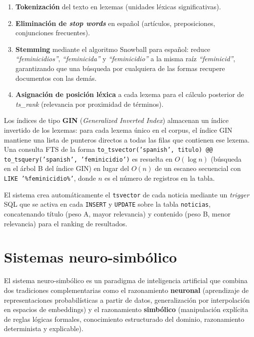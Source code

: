 \begin{enumerate}
    \item \textbf{Tokenización} del texto en lexemas (unidades léxicas significativas).
    \item \textbf{Eliminación de \textit{stop words}} en español (artículos,
          preposiciones, conjunciones frecuentes).
    \item \textbf{Stemming} mediante el algoritmo Snowball para español: reduce
          \textit{``feminicidios''}, \textit{``feminicida''} y
          \textit{``feminicidio''} a la misma raíz \textit{``feminicid''},
          garantizando que una búsqueda por cualquiera de las formas recupere
          documentos con las demás.
    \item \textbf{Asignación de posición léxica} a cada lexema para el cálculo
          posterior de \textit{ts\_rank} (relevancia por proximidad de términos).
\end{enumerate}

Los índices de tipo \textbf{GIN} (\textit{Generalized Inverted Index})
\cite{ramakrishnan2000database} almacenan un índice invertido de los lexemas:
para cada lexema único en el corpus, el índice GIN mantiene una lista de punteros
directos a todas las filas que contienen ese lexema. Una consulta FTS de la forma
\texttt{to\_tsvector('spanish', titulo) @@ to\_tsquery('spanish', 'feminicidio')}
es resuelta en $O(\log n)$ (búsqueda en el árbol B del índice GIN) en lugar del
$O(n)$ de un escaneo secuencial con \texttt{LIKE '\%feminicidio\%'}, donde $n$
es el número de registros en la tabla.

El sistema crea automáticamente el \texttt{tsvector} de cada noticia mediante un
\textit{trigger} SQL que se activa en cada \texttt{INSERT} y \texttt{UPDATE}
sobre la tabla \texttt{noticias}, concatenando título (peso A, mayor relevancia)
y contenido (peso B, menor relevancia) para el ranking de resultados.

\section{Sistemas neuro-simbólico}
\label{sec:mt_neurosimbolico}

El sistema neuro-simbólico \cite{garcez2022neurosymbolic} es un paradigma de
inteligencia artificial que combina dos tradiciones complementarias como el razonamiento
\textbf{neuronal} (aprendizaje de representaciones probabilísticas a partir de datos,
generalización por interpolación en espacios de embeddings) y el razonamiento
\textbf{simbólico} (manipulación explícita de reglas lógicas formales, conocimiento
estructurado del dominio, razonamiento determinista y explicable).


